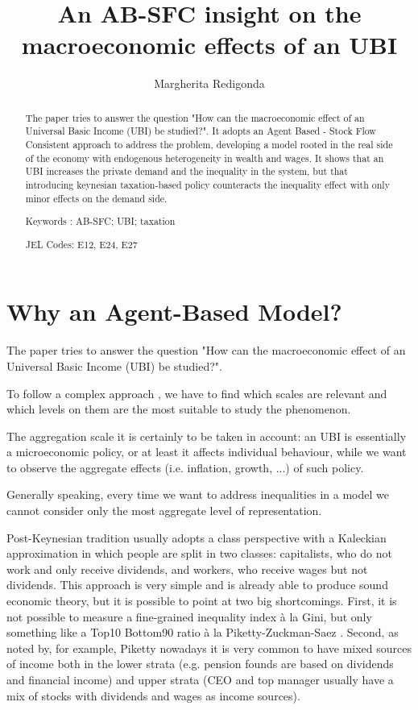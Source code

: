 \documentclass[]{article}
\title{An AB-SFC insight on the macroeconomic effects of an UBI}
\author{Margherita Redigonda}
\date{}
\begin{document}
\maketitle

\begin{abstract}
    The paper tries to answer the question "How can the macroeconomic effect of an Universal Basic Income (UBI) be studied?".
    It adopts an Agent Based - Stock Flow Consistent approach to address the problem, developing a model rooted in the real side of the economy with endogenous heterogeneity in wealth and wages.
    It shows that an UBI increases the private demand and the inequality in the system, but that introducing keynesian taxation-based policy counteracts the inequality effect with only minor effects on the demand side.

Keywords : AB-SFC; UBI; taxation

JEL Codes: E12, E24, E27
\end{abstract}

\section{Why an Agent-Based Model?}
\label{ch:why}
The paper tries to answer the question "How can the macroeconomic effect of an Universal Basic Income (UBI) be studied?".

To follow a complex approach \parencite{Redigonda2023}, we have to find which scales are relevant and which levels on them are the most suitable to study the phenomenon.

The aggregation scale it is certainly to be taken in account: an UBI is essentially a microeconomic policy, or at least it affects individual behaviour, while we want to observe the aggregate effects (i.e. inflation, growth, ...) of such policy.

Generally speaking, every time we want to address inequalities in a model we cannot consider only the most aggregate level of representation.

Post-Keynesian tradition usually adopts a class perspective with a Kaleckian approximation in which people are split in two classes: capitalists, who do not work and only receive dividends, and workers, who receive wages but not dividends.
This approach is very simple and is already able to produce sound economic theory, but it is possible to point at two big shortcomings.
First, it is not possible to measure a fine-grained inequality index à la Gini, but only something like a Top10 Bottom90 ratio à la Piketty-Zuckman-Saez \parencite{piketty2003, piketty2014}.
Second, as noted by, for example, Piketty nowadays it is very common to have mixed sources of income both in the lower strata (e.g. pension founds are based on dividends and financial income) and upper strata (CEO and top manager usually have a mix of stocks with dividends and wages as income sources).
\end{document}
